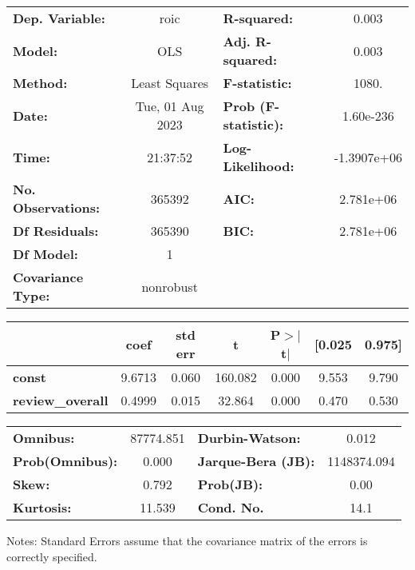 \begin{center}
\begin{tabular}{lclc}
\toprule
\textbf{Dep. Variable:}    &       roic       & \textbf{  R-squared:         } &      0.003   \\
\textbf{Model:}            &       OLS        & \textbf{  Adj. R-squared:    } &      0.003   \\
\textbf{Method:}           &  Least Squares   & \textbf{  F-statistic:       } &      1080.   \\
\textbf{Date:}             & Tue, 01 Aug 2023 & \textbf{  Prob (F-statistic):} &  1.60e-236   \\
\textbf{Time:}             &     21:37:52     & \textbf{  Log-Likelihood:    } & -1.3907e+06  \\
\textbf{No. Observations:} &      365392      & \textbf{  AIC:               } &  2.781e+06   \\
\textbf{Df Residuals:}     &      365390      & \textbf{  BIC:               } &  2.781e+06   \\
\textbf{Df Model:}         &           1      & \textbf{                     } &              \\
\textbf{Covariance Type:}  &    nonrobust     & \textbf{                     } &              \\
\bottomrule
\end{tabular}
\begin{tabular}{lcccccc}
                         & \textbf{coef} & \textbf{std err} & \textbf{t} & \textbf{P$> |$t$|$} & \textbf{[0.025} & \textbf{0.975]}  \\
\midrule
\textbf{const}           &       9.6713  &        0.060     &   160.082  &         0.000        &        9.553    &        9.790     \\
\textbf{review\_overall} &       0.4999  &        0.015     &    32.864  &         0.000        &        0.470    &        0.530     \\
\bottomrule
\end{tabular}
\begin{tabular}{lclc}
\textbf{Omnibus:}       & 87774.851 & \textbf{  Durbin-Watson:     } &      0.012   \\
\textbf{Prob(Omnibus):} &    0.000  & \textbf{  Jarque-Bera (JB):  } & 1148374.094  \\
\textbf{Skew:}          &    0.792  & \textbf{  Prob(JB):          } &       0.00   \\
\textbf{Kurtosis:}      &   11.539  & \textbf{  Cond. No.          } &       14.1   \\
\bottomrule
\end{tabular}
\end{center}

Notes: \newline
 [1] Standard Errors assume that the covariance matrix of the errors is correctly specified.